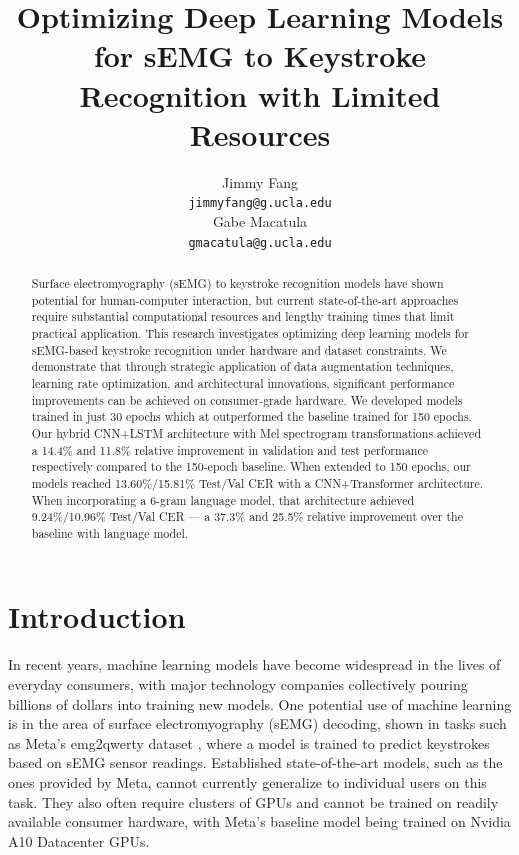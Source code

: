 \documentclass{article}
\title{Optimizing Deep Learning Models for sEMG to Keystroke Recognition with Limited Resources}
\author{
  Jimmy Fang \\
  \texttt{jimmyfang@g.ucla.edu} \\
  \And
  Gabe Macatula \\
  \texttt{gmacatula@g.ucla.edu}
}
\begin{document}
\maketitle

\begin{abstract}
  Surface electromyography (sEMG) to keystroke recognition models have shown potential for human-computer interaction, but current state-of-the-art approaches require substantial computational resources and lengthy training times that limit practical application. This research investigates optimizing deep learning models for sEMG-based keystroke recognition under hardware and dataset constraints. We demonstrate that through strategic application of data augmentation techniques, learning rate optimization, and architectural innovations, significant performance improvements can be achieved on consumer-grade hardware. We developed models trained in just 30 epochs which at outperformed the baseline trained for 150 epochs. Our hybrid CNN+LSTM architecture with Mel spectrogram transformations achieved a 14.4\% and 11.8\% relative improvement in validation and test performance respectively compared to the 150-epoch baseline. When extended to 150 epochs, our models reached 13.60\%/15.81\% Test/Val CER with a CNN+Transformer architecture. When incorporating a 6-gram language model, that architecture achieved 9.24\%/10.96\% Test/Val CER — a 37.3\% and 25.5\% relative improvement over the baseline with language model.
\end{abstract}

\section{Introduction}

In recent years, machine learning models have become widespread in the lives of everyday consumers, with major technology companies collectively pouring billions of dollars into training new models. One potential use of machine learning is in the area of surface electromyography (sEMG) decoding, shown in tasks such as Meta's emg2qwerty dataset \cite{emg2qwerty2024}, where a model is trained to predict keystrokes based on sEMG sensor readings. Established state-of-the-art models, such as the ones provided by Meta, cannot currently generalize to individual users on this task. They also often require clusters of GPUs and cannot be trained on readily available consumer hardware, with Meta’s baseline model being trained on Nvidia A10 Datacenter GPUs. 
\end{document}
